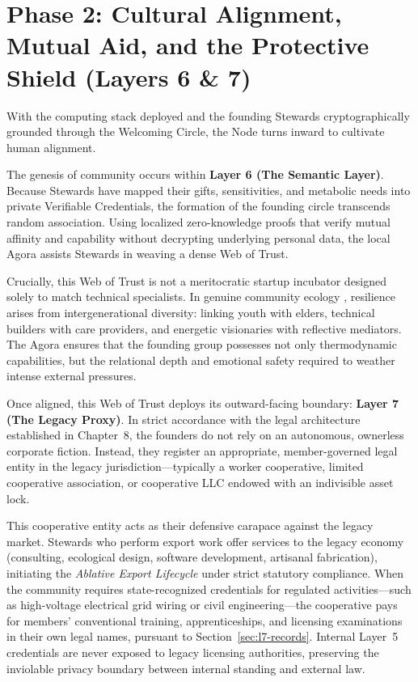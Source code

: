 \section{Phase 2: Cultural Alignment, Mutual Aid, and the Protective Shield (Layers 6 \& 7)}

With the computing stack deployed and the founding Stewards cryptographically grounded through the Welcoming Circle, the Node turns inward to cultivate human alignment. 

The genesis of community occurs within \textbf{Layer 6 (The Semantic Layer)}. Because Stewards have mapped their gifts, sensitivities, and metabolic needs into private Verifiable Credentials, the formation of the founding circle transcends random association. Using localized zero-knowledge proofs that verify mutual affinity and capability without decrypting underlying personal data, the local Agora assists Stewards in weaving a dense Web of Trust. 

Crucially, this Web of Trust is not a meritocratic startup incubator designed solely to match technical specialists. In genuine community ecology \parencite{bookchin1982}, resilience arises from intergenerational diversity: linking youth with elders, technical builders with care providers, and energetic visionaries with reflective mediators. The Agora ensures that the founding group possesses not only thermodynamic capabilities, but the relational depth and emotional safety required to weather intense external pressures.

Once aligned, this Web of Trust deploys its outward-facing boundary: \textbf{Layer 7 (The Legacy Proxy)}. In strict accordance with the legal architecture established in Chapter~8, the founders do not rely on an autonomous, ownerless corporate fiction. Instead, they register an appropriate, member-governed legal entity in the legacy jurisdiction---typically a worker cooperative, limited cooperative association, or cooperative LLC endowed with an indivisible asset lock. 

This cooperative entity acts as their defensive carapace against the legacy market. Stewards who perform export work offer services to the legacy economy (consulting, ecological design, software development, artisanal fabrication), initiating the \textit{Ablative Export Lifecycle} under strict statutory compliance. When the community requires state-recognized credentials for regulated activities---such as high-voltage electrical grid wiring or civil engineering---the cooperative pays for members' conventional training, apprenticeships, and licensing examinations in their own legal names, pursuant to Section~\ref{sec:l7-records}. Internal Layer~5 credentials are never exposed to legacy licensing authorities, preserving the inviolable privacy boundary between internal standing and external law.

